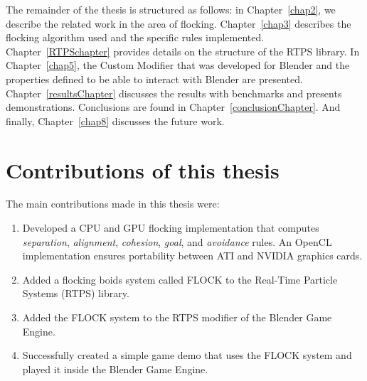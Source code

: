 
The remainder of the thesis is structured as follows:  in Chapter~\ref{chap2}, we describe the related work in the area of flocking. Chapter~\ref{chap3} describes the flocking algorithm used and the specific rules implemented. Chapter~\ref{RTPSchapter} provides details on the structure of the RTPS library. In Chapter~\ref{chap5}, the Custom Modifier that was developed for Blender and the properties defined to be able to interact with Blender are presented. Chapter~\ref{resultsChapter} discusses the results with benchmarks and presents demonstrations. Conclusions are found in Chapter~\ref{conclusionChapter}.  And finally, Chapter~\ref{chap8} discusses the future work. 

\section{Contributions of this thesis}
The main contributions made in this thesis were:
\begin{enumerate}
\item Developed a CPU and GPU flocking implementation that computes \textit{separation}, \textit{alignment}, \textit{cohesion}, \textit{goal}, and \textit{avoidance} rules. An OpenCL implementation ensures portability between ATI and NVIDIA graphics cards.
\item Added a flocking boids system called FLOCK to the Real-Time Particle Systems (RTPS) library.
\item Added the FLOCK system to the RTPS modifier of the Blender Game Engine.
\item Successfully created a simple game demo that uses the FLOCK system and played it inside the Blender Game Engine.
\end{enumerate}
